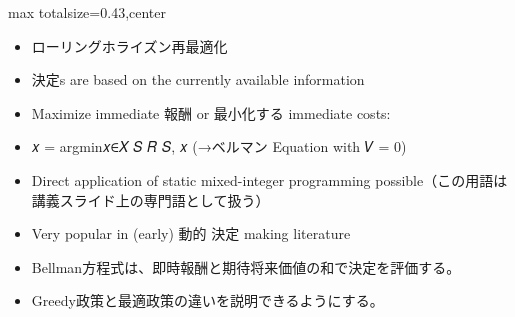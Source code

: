 \clearpage
{}
\begin{minipage}[t]{0.405\textwidth}
\begin{adjustbox}{max totalsize={\textwidth}{0.43\textheight},center}
\begin{minipage}{\textwidth}\scriptsize
{}\begin{itemize}
\item ローリングホライズン再最適化
\item 決定s are based on the currently available information
\item Maximize immediate 報酬 or 最小化する immediate costs:
\item 𝑥 = argmin𝑥∈𝑋 𝑆 𝑅 𝑆, 𝑥 (→ベルマン Equation with 𝑉 = 0)
\item Direct application of static mixed-integer programming possible（この用語は講義スライド上の専門語として扱う）
\item Very popular in (early) 動的 決定 making literature
\end{itemize}\begin{itemize}
\item Bellman方程式は、即時報酬と期待将来価値の和で決定を評価する。
\item Greedy政策と最適政策の違いを説明できるようにする。
\end{itemize}
\end{minipage}
\end{adjustbox}
\end{minipage}\hfill
